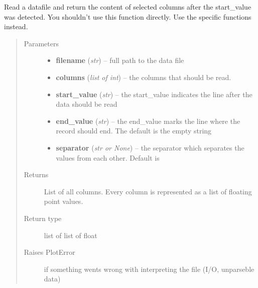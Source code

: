 \documentclass[a4paper,11pt,english]{sphinxmanual}
\begin{document}
\begin{fulllineitems}
\label{programming/utilities:samples.utils.plots.read_plot_file_beginning_after_start_value}
Read a datafile and return the content of selected columns after the
start\_value was detected.  You shouldn't use this function directly. Use
the specific functions instead.
\begin{quote}\begin{description}
\item[{Parameters}] \leavevmode\begin{itemize}
\item {} 
\textbf{filename} (\emph{str}) -- full path to the data file

\item {} 
\textbf{columns} (\emph{list of int}) -- the columns that should be read.

\item {} 
\textbf{start\_value} (\emph{str}) -- the start\_value indicates the line after the data
should be read

\item {} 
\textbf{end\_value} (\emph{str}) -- the end\_value marks the line where the record should
end.  The default is the empty string

\item {} 
\textbf{separator} (\emph{str or None}) -- the separator which separates the values from each
other.  Default is 

\end{itemize}

\item[{Returns}] \leavevmode
List of all columns.  Every column is represented as a list of floating
point values.

\item[{Return type}] \leavevmode
list of list of float

\item[{Raises PlotError}] \leavevmode
if something wents wrong with interpreting the file (I/O,
unparseble data)

\end{description}\end{quote}

\end{fulllineitems}
\end{document}

